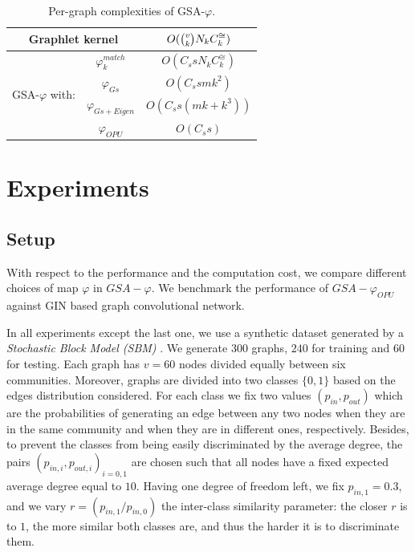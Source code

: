 \documentclass{article}
\begin{document}
\begin{table}
\centering
\begin{tabular}{|c|c|c|}
\hline
\multicolumn{2}{|c|}{Graphlet kernel} & $O(\tbinom{v}{k} N_k C^{\cong}_k)$\\ \hline \hline
%
\multirow{4}{*}{GSA-$\varphi$ with:} & $\varphi^{match}_k$ & $O(C_s s N_k C^{\cong}_k)$ \\
& $\varphi_{Gs}$ & $O(C_s s m k^2)$ \\ 
& $\varphi_{Gs+Eigen}$  & $O(C_s s (m k + k^3))$ \\ 
& $\varphi_{OPU}$  & $O(C_s s)$ \\ \hline
\end{tabular}
\caption{Per-graph complexities of GSA-$\varphi$.}
\label{tab:cost}
\end{table}


\section{Experiments}\label{sec:experiments}
\subsection{Setup}\label{sec:setup}
With respect to the performance and  the computation cost, we compare different choices of  map $\varphi$ in $GSA-\varphi$. We benchmark the performance of $GSA-\varphi_{OPU}$ against GIN based graph convolutional network.

In all experiments except the last one, we use a synthetic dataset generated by a \emph{Stochastic Block Model (SBM)} \cite{SBM}. We generate $300$ graphs, $240$ for training  and $60$ for testing. Each graph has $v=60$ nodes divided equally between six communities. Moreover, graphs are divided into two classes $\{0 , 1\}$ based on the edges distribution considered. For each class we fix two values $(p_{in} , p_{out})$ which are  the probabilities of generating an edge between any two nodes when they are in the same community and when they are in different ones, respectively. Besides, to prevent the classes from being easily discriminated by the average degree, the pairs $(p_{in,i} , p_{out,i})_{i=0,1}$ are chosen such that all nodes have a fixed expected average degree equal to $10$. Having one degree of freedom left, we fix $p_{in,1}=0.3$, and we vary $r=(p_{in,1}/p_{in,0})$ the inter-class similarity parameter: the closer $r$ is to $1$, the more similar both classes are, and thus the harder it is to discriminate them.
\end{document}
